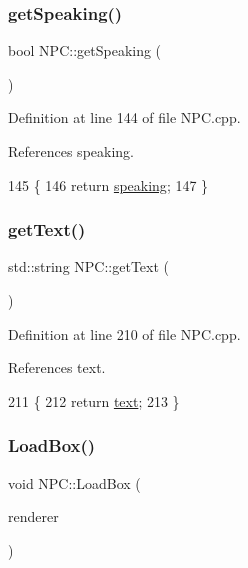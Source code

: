 \subsubsection{\texorpdfstring{get\+Speaking()}{getSpeaking()}}
{\footnotesize\ttfamily bool N\+P\+C\+::get\+Speaking (\begin{DoxyParamCaption}{ }\end{DoxyParamCaption})}



Definition at line 144 of file N\+P\+C.\+cpp.



References speaking.


\begin{DoxyCode}
145 \{
146     \textcolor{keywordflow}{return} \hyperlink{class_n_p_c_a0dc17cd2d9b7d486e6d74089819117e7}{speaking};
147 \}
\end{DoxyCode}
\mbox{\label{class_n_p_c_a480c5ef808977d9d81aef0f9e7b2093f}} 
\subsubsection{\texorpdfstring{get\+Text()}{getText()}}
{\footnotesize\ttfamily std\+::string N\+P\+C\+::get\+Text (\begin{DoxyParamCaption}{ }\end{DoxyParamCaption})}



Definition at line 210 of file N\+P\+C.\+cpp.



References text.


\begin{DoxyCode}
211 \{
212     \textcolor{keywordflow}{return} \hyperlink{class_n_p_c_a64ad332dcfeb84a7a6bedd404378f05b}{text};
213 \}
\end{DoxyCode}
\mbox{\label{class_n_p_c_aa9d97773d1a9b49e2a8dd5adaa23beff}} 
\subsubsection{\texorpdfstring{Load\+Box()}{LoadBox()}}
{\footnotesize\ttfamily void N\+P\+C\+::\+Load\+Box (\begin{DoxyParamCaption}\item[{S\+D\+L\+\_\+\+Renderer $\ast$}]{renderer }\end{DoxyParamCaption})}



